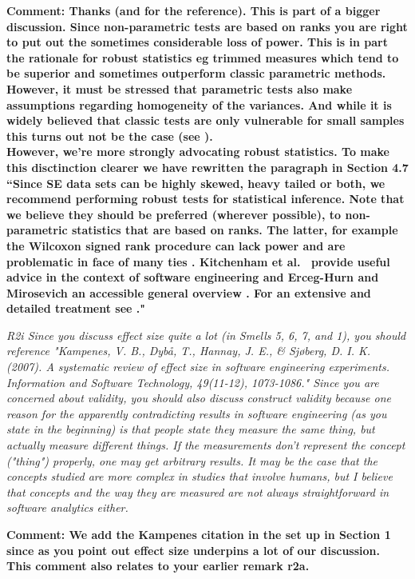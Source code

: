 \documentclass[preprint,10pt]{elsarticle}
\begin{document}
{\bf Comment: Thanks (and for the reference). This is part of a bigger discussion.  Since non-parametric tests are based on ranks you are right to put out the sometimes considerable loss of power.  This is in part the rationale for robust statistics eg trimmed measures which tend to be superior and sometimes outperform classic parametric methods.  However, it must be stressed that parametric tests \textbf{also} make assumptions regarding homogeneity of the variances.  And while it is widely believed that classic tests are only vulnerable for small samples this turns out not be the case (see \cite{Erce08,Wilc98}). \\
However, we're more strongly advocating robust statistics.  To make this disctinction clearer we have rewritten the paragraph in Section 4.7\\
``Since SE data sets can be highly skewed, heavy tailed or both,   we recommend performing robust tests for statistical inference. Note that we believe they should be preferred (wherever possible), to non-parametric statistics that are based on ranks. The latter,   for example the Wilcoxon signed rank procedure can lack power and are problematic in face of many ties \cite{Blai85}.  Kitchenham et al.~\cite{Kitc17} provide useful advice in the context of software engineering and Erceg-Hurn and Mirosevich an accessible general overview \cite{Erce08}.  For an extensive and detailed treatment see \cite{Wilc12}."
}

{\em
R2i
Since you discuss effect size quite a lot (in Smells 5, 6, 7, and 1), you should reference "Kampenes, V. B., Dybå, T., Hannay, J. E., & Sjøberg, D. I. K. (2007). A systematic review of effect size in software engineering experiments. Information and Software Technology, 49(11-12), 1073-1086."
Since you are concerned about validity, you should also discuss construct validity because one reason for the apparently contradicting results in software engineering (as you state in the beginning) is that people state they measure the same thing, but actually measure different things. If the measurements don't represent the concept ("thing") properly, one may get arbitrary results. It may be the case that the concepts studied are more complex in studies that involve humans, but I believe that concepts and the way they are measured are not always straightforward in software analytics either.
}

{\bf Comment: We add the Kampenes citation in the set up in Section 1 since as you point out effect size underpins a lot of our discussion.  This comment also relates to your earlier remark r2a.}
\end{document}
